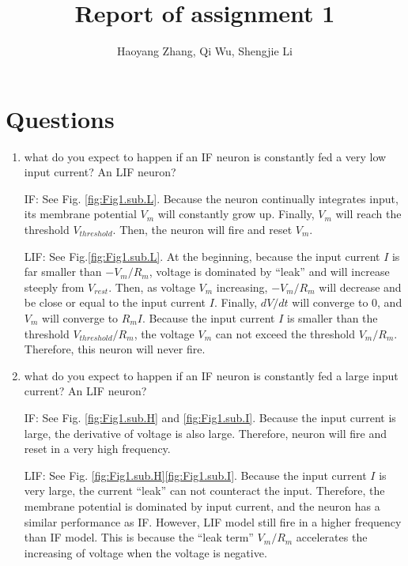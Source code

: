 \documentclass[11pt]{article}
\title{Report of assignment 1}
\author{Haoyang Zhang, Qi Wu, Shengjie Li}
\begin{document}
\maketitle

	\section*{Questions}
	\begin{enumerate}
		\item what do you expect to happen if an IF neuron is constantly fed a very low input current? An LIF neuron?
		
		IF: See Fig. \ref{fig:Fig1.sub.L}. Because the neuron continually integrates input, its membrane potential $V_m$ will constantly grow up. Finally, $V_m$ will reach the threshold $V_{threshold}$. Then, the neuron will fire and reset $V_m$.
		
		LIF: See Fig.\ref{fig:Fig1.sub.L}. At the beginning, because the input current $I$ is far smaller than $-V_m/R_m$, voltage is dominated by ``leak'' and will increase steeply from $V_{rest}$. Then, as voltage $V_m$ increasing, $-V_m/R_m$ will decrease and be close or equal to the input current $I$. Finally, $dV/dt$ will converge to 0, and $V_m$ will converge to $R_mI$. Because the input current $I$ is smaller than the threshold $V_{threshold}/R_m$, the voltage $V_m$ can not exceed the threshold $V_m/R_m$. Therefore, this neuron will never fire.
		
		\item what do you expect to happen if an IF neuron is constantly fed a large input current? An LIF neuron?
			
		IF: See Fig. \ref{fig:Fig1.sub.H} and \ref{fig:Fig1.sub.I}. Because the input current is large, the derivative of voltage is also large. Therefore, neuron will fire and reset in a very high frequency.
		
		LIF: See Fig. \ref{fig:Fig1.sub.H}\ref{fig:Fig1.sub.I}. Because the input current $I$ is very large, the current ``leak'' can not counteract the input. Therefore, the membrane potential is dominated by input current, and the neuron has a similar performance as IF. However, LIF model still fire in a higher frequency than IF model. This is because the ``leak term'' $V_m/R_m$ accelerates the increasing of voltage when the voltage is negative.
				

\end{enumerate}
\end{document}
